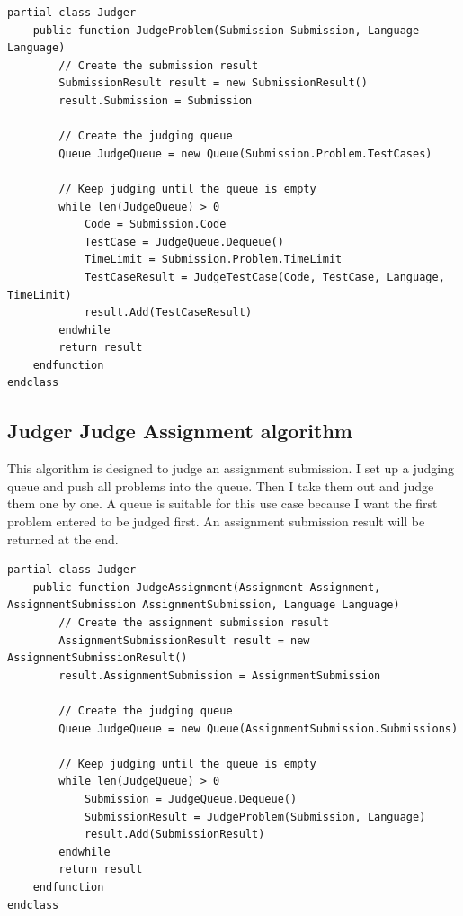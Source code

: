 \documentclass[a4paper]{report}
\begin{document}
\begin{verbatim}
partial class Judger
    public function JudgeProblem(Submission Submission, Language Language)
        // Create the submission result
        SubmissionResult result = new SubmissionResult()
        result.Submission = Submission

        // Create the judging queue
        Queue JudgeQueue = new Queue(Submission.Problem.TestCases)

        // Keep judging until the queue is empty
        while len(JudgeQueue) > 0
            Code = Submission.Code
            TestCase = JudgeQueue.Dequeue()
            TimeLimit = Submission.Problem.TimeLimit
            TestCaseResult = JudgeTestCase(Code, TestCase, Language, TimeLimit)
            result.Add(TestCaseResult)
        endwhile
        return result
    endfunction
endclass
\end{verbatim}

\subsection{Judger Judge Assignment algorithm}

This algorithm is designed to judge an assignment submission. I set up a judging queue and push all problems into the queue. Then I take them out and judge them one by one. A queue is suitable for this use case because I want the first problem entered to be judged first. An assignment submission result will be returned at the end.

\begin{verbatim}
partial class Judger
    public function JudgeAssignment(Assignment Assignment, AssignmentSubmission AssignmentSubmission, Language Language)
        // Create the assignment submission result
        AssignmentSubmissionResult result = new AssignmentSubmissionResult()
        result.AssignmentSubmission = AssignmentSubmission

        // Create the judging queue
        Queue JudgeQueue = new Queue(AssignmentSubmission.Submissions)

        // Keep judging until the queue is empty
        while len(JudgeQueue) > 0
            Submission = JudgeQueue.Dequeue()
            SubmissionResult = JudgeProblem(Submission, Language)
            result.Add(SubmissionResult)
        endwhile
        return result
    endfunction
endclass
\end{verbatim}
\end{document}
